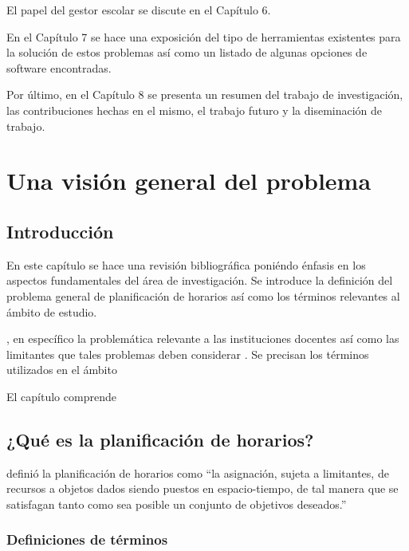 \documentclass[draft,12pt,headsepline,footsepline,paper=letter]{scrreprt}
\begin{document}
El papel del gestor escolar se discute en el Capítulo 6.

En el Capítulo 7 se hace una exposición del tipo de herramientas existentes para la solución de estos problemas así como un listado de algunas opciones de software encontradas.

Por último, en el Capítulo 8 se presenta un resumen del trabajo de investigación, las contribuciones hechas en el mismo, el trabajo futuro y la diseminación de trabajo.

\chapter{Una visión general del problema}


\section{Introducción}

En este capítulo se hace una revisión bibliográfica poniéndo énfasis en los aspectos fundamentales del área de investigación. Se introduce la definición del problema general de planificación de horarios así como los términos relevantes al ámbito de estudio. 

, en específico la problemática relevante a las instituciones docentes así como las limitantes que tales problemas deben considerar \citep[p.~8]{abdullah06heuristic-approaches}. Se precisan los términos utilizados en el ámbito

El capítulo comprende 


\section{¿Qué es la planificación de horarios?}

\citet[p.~53]{wren95scheduling-timetabling} definió la planificación de horarios como “la asignación, sujeta a limitantes, de recursos a objetos dados siendo puestos en espacio-tiempo, de tal manera que se satisfagan tanto como sea posible un conjunto de objetivos deseados.”

\subsection{Definiciones de términos}
\end{document}
